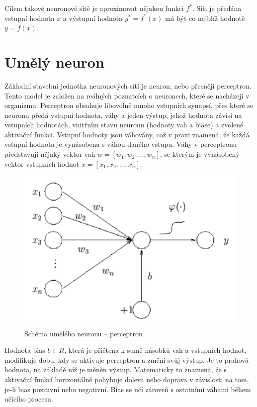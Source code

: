 Cílem takové neuronové sítě je aproximovat nějakou funkci $f^\ast$. Síti je předána vstupní hodnota $x$ a výstupní hodnota $y^\ast = f^\ast(x)$ má být co nejblíž hodnotě $y = f(x)$.


\section{Umělý neuron}
Základní stavební jednotka neuronových sítí je neuron, nebo přesněji perceptron. Tento model je založen na reálných poznatcích o neuronech, které se nacházejí v organizmu. Perceptron obsahuje libovolně mnoho vstupních synapsí, přes které se neuronu předá vstupní hodnota, váhy a jeden výstup, jehož hodnota závisí na vstupních hodnotách, vnitřním stavu neuronu (hodnoty vah a biase) a zvolené aktivační funkci. Vstupní hodnoty jsou váhovány, což v praxi znamená, že každá vstupní hodnota je vynásobena s váhou daného vstupu. Váhy v perceptronu představují nějaký vektor vah $w = [w_1, w_2, \dots, w_n]$, se kterým je vynásobený vektor vstupních hodnot $x = [x_1, x_2, \dots, x_n]$.

\begin{figure}[H]
    \centering
    \includegraphics[scale=0.5]{obrazky-figures/perceptron.png}
    \caption{\label{fig:neuron}Schéma umělého neuronu -- perceptron}
\end{figure}

Hodnota bias $b \in R$, která je přičtena k sumě násobků vah a vstupních hodnot, modifikuje dobu, kdy se aktivuje perceptron a změní svůj výstup. Je to prahová hodnota, na základě níž je měněn výstup. Matematicky to znamená, že s aktivační funkcí horizontálně pohybuje doleva nebo doprava v závislosti na tom, je-li bias pozitivní nebo negativní. Bias se učí zároveň s ostatními váhami během učícího procesu.

